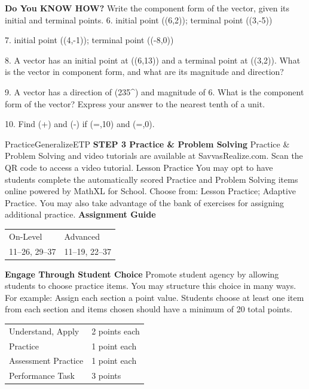 \documentclass{article}
\newenvironment{concept-summary}{}{}    %
\newenvironment{te-addendum}[2]{}{}     %
\newcommand{\answer}[1]{}               %
\begin{document}
\begin{concept-summary}
\answer{Quadrant II}
\textbf{Do You KNOW HOW?}
Write the component form of the vector, given its initial and terminal points.
6. initial point ((6,2)); terminal point ((3,-5))
\answer{(\langle-3,-7\rangle)}
7. initial point ((4,-1)); terminal point ((-8,0))
\answer{(\langle-12,1\rangle)}
8. A vector has an initial point at ((6,13)) and a terminal point at ((3,2)). What is the vector in component form, and what are its magnitude and direction?
\answer{(\langle-3,-11\rangle); magnitude (\approx11.4); direction (\approx254.7^\circ)}
9. A vector has a direction of (235^\circ) and magnitude of 6. What is the component form of the vector? Express your answer to the nearest tenth of a unit.
\answer{(\langle-3.4,-4.9\rangle)}
10. Find (+) and (-) if (=,10\rangle) and (=,0\rangle).
\answer{sum (\langle3,10\rangle); difference (\langle9,10\rangle)}
\end{concept-summary}
\begin{te-addendum}{Practice}{GeneralizeETP}
\textbf{STEP 3 Practice & Problem Solving}
Practice & Problem Solving and video tutorials are available at SavvasRealize.com.
Scan the QR code to access a video tutorial.
Lesson Practice You may opt to have students complete the automatically scored Practice and Problem Solving items online powered by MathXL for School.
Choose from: Lesson Practice; Adaptive Practice.
You may also take advantage of the bank of exercises for assigning additional practice.
\textbf{Assignment Guide}
\begin{tabular}{ll}
On-Level & Advanced \\
11--26, 29--37 & 11--19, 22--37 \\
\end{tabular}
\textbf{Engage Through Student Choice}
Promote student agency by allowing students to choose practice items. You may structure this choice in many ways.
For example:
Assign each section a point value. Students choose at least one item from each section and items chosen should have a minimum of 20 total points.
\begin{tabular}{ll}
Understand, Apply & 2 points each \\
Practice & 1 point each \\
Assessment Practice & 1 point each \\
Performance Task & 3 points \\
\end{tabular}
\end{te-addendum}
\end{document}
